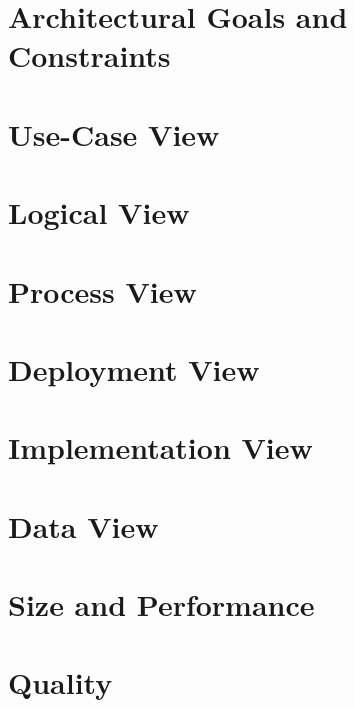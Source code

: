 \documentclass{article}
\begin{document}
\section{Architectural Goals and Constraints}

\section{Use-Case View}

\section{Logical View}

\section{Process View}

\section{Deployment View}

\section{Implementation View}

\section{Data View}

\section{Size and Performance}

\section{Quality}
\end{document}
